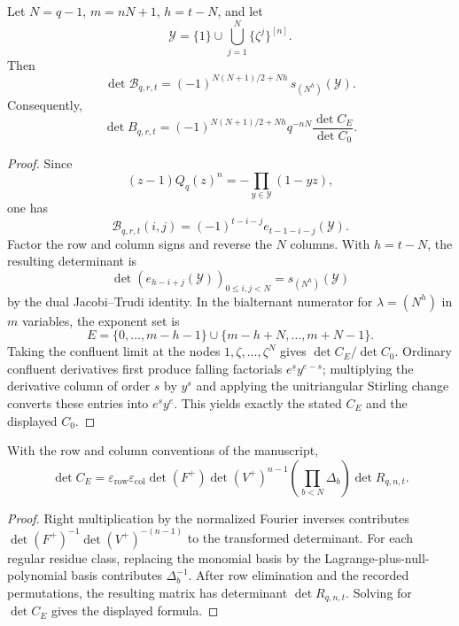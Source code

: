 
\begin{lemma}
Let $N=q-1$, $m=nN+1$, $h=t-N$, and let
\[
 \mathcal Y=\{1\}\cup\bigcup_{j=1}^{N}\{\zeta^j\}^{[n]}.
\]
Then
\[
 \det \mathcal B_{q,r,t}
 =(-1)^{N(N+1)/2+Nh}\,s_{(N^h)}(\mathcal Y).
\]
Consequently,
\[
 \det B_{q,r,t}
 =(-1)^{N(N+1)/2+Nh}q^{-nN}
   \frac{\det C_E}{\det C_0}.
\]
\end{lemma}

\begin{proof}
Since
\[
 (z-1)Q_q(z)^n=-\prod_{y\in\mathcal Y}(1-yz),
\]
one has
\[
 \mathcal B_{q,r,t}(i,j)
 =(-1)^{t-i-j}e_{t-1-i-j}(\mathcal Y).
\]
Factor the row and column signs and reverse the $N$ columns.  With
$h=t-N$, the resulting determinant is
\[
 \det(e_{h-i+j}(\mathcal Y))_{0\le i,j<N}
 =s_{(N^h)}(\mathcal Y)
\]
by the dual Jacobi--Trudi identity.  In the bialternant numerator for
$\lambda=(N^h)$ in $m$ variables, the exponent set is
\[
 E=\{0,\ldots,m-h-1\}\cup\{m-h+N,\ldots,m+N-1\}.
\]
Taking the confluent limit at the nodes $1,\zeta,\ldots,\zeta^N$ gives
$\det C_E/\det C_0$.  Ordinary confluent derivatives first produce
falling factorials $e^{\underline s}y^{e-s}$; multiplying the derivative
column of order $s$ by $y^s$ and applying the unitriangular Stirling
change converts these entries into $e^sy^e$.  This yields exactly the
stated $C_E$ and the displayed $C_0$.
\end{proof}

\begin{proposition}
With the row and column conventions of the manuscript,
\[
 \boxed{
 \det C_E=
 \varepsilon_{\mathrm{row}}\varepsilon_{\mathrm{col}}
 \det(F^+)\det(V^+)^{n-1}
 \left(\prod_{b<N}\Delta_b\right)
 \det R_{q,n,t}.}
\]
\end{proposition}

\begin{proof}
Right multiplication by the normalized Fourier inverses contributes
$\det(F^+)^{-1}\det(V^+)^{-(n-1)}$ to the transformed determinant.
For each regular residue class, replacing the monomial basis by the
Lagrange-plus-null-polynomial basis contributes $\Delta_b^{-1}$.
After row elimination and the recorded permutations, the resulting
matrix has determinant $\det R_{q,n,t}$.  Solving for $\det C_E$ gives
the displayed formula.
\end{proof}

